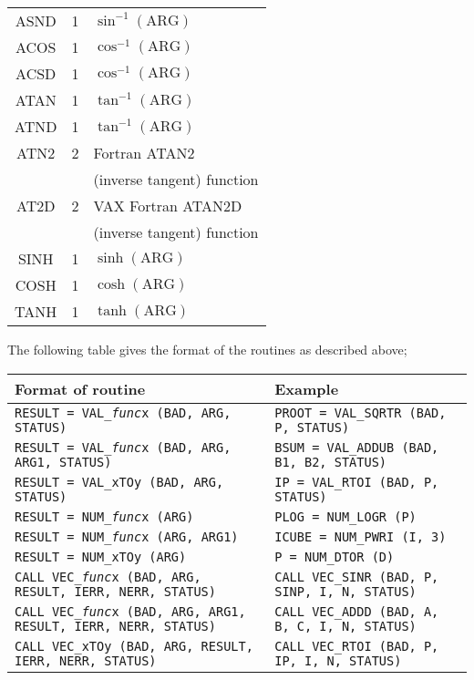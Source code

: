 {\begin{tabular}{|c|c|l|}
ASND & 1 & $\sin ^{-1}(\mbox{ARG})$ \\
ACOS & 1 & $\cos ^{-1}(\mbox{ARG})$ \\
ACSD & 1 & $\cos ^{-1}(\mbox{ARG})$ \\
ATAN & 1 & $\tan ^{-1}(\mbox{ARG})$ \\
ATND & 1 & $\tan ^{-1}(\mbox{ARG})$ \\
ATN2 & 2 & Fortran ATAN2 \\
     &   & (inverse tangent) function \\
AT2D & 2 & VAX Fortran ATAN2D\\
     &   & (inverse tangent) function \\
SINH & 1 & $\sinh (\mbox{ARG})$ \\
COSH & 1 & $\cosh (\mbox{ARG})$ \\
TANH & 1 & $\tanh (\mbox{ARG})$ \\ \hline
\end{tabular}
}

\newpage
The following table gives the format of the routines as described above;

{\small
\begin{tabular}{|l|l|} \hline
Format of routine & Example\\ \hline
{\tt RESULT = VAL\_{\sl func\/}x (BAD, ARG, STATUS)}& 
{\tt PROOT = VAL\_SQRTR (BAD, P, STATUS)} \\
{\tt RESULT = VAL\_{\sl func\/}x (BAD, ARG, ARG1, STATUS)}&
{\tt BSUM = VAL\_ADDUB (BAD, B1, B2, STATUS)} \\
{\tt RESULT = VAL\_xTOy (BAD, ARG, STATUS)}& 
{\tt IP = VAL\_RTOI (BAD, P, STATUS)} \\
{\tt RESULT = NUM\_{\sl func\/}x (ARG)}& 
{\tt PLOG = NUM\_LOGR (P)} \\
{\tt RESULT = NUM\_{\sl func\/}x (ARG, ARG1)}& 
{\tt ICUBE = NUM\_PWRI (I, 3)} \\
{\tt RESULT = NUM\_xTOy (ARG)}& 
{\tt P = NUM\_DTOR (D)} \\
{\tt CALL VEC\_{\sl func\/}x (BAD, ARG, RESULT, IERR, NERR, STATUS)}& 
{\tt CALL VEC\_SINR (BAD, P, SINP, I, N, STATUS)} \\
{\tt CALL VEC\_{\sl func\/}x (BAD, ARG, ARG1, RESULT, IERR, NERR, STATUS)}& 
{\tt CALL VEC\_ADDD (BAD, A, B, C, I, N, STATUS)} \\
{\tt CALL VEC\_xTOy (BAD, ARG, RESULT, IERR, NERR, STATUS)}& 
{\tt CALL VEC\_RTOI (BAD, P, IP, I, N, STATUS)} \\
\hline
\end{tabular}
}

